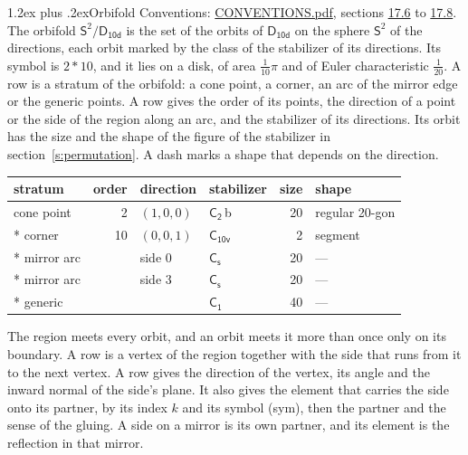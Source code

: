 \documentclass[10pt,a4paper]{article}
\makeatletter
\renewcommand\section{\@startsection{section}{1}{\z@}{-3ex plus -1ex minus -.2ex}%
  {1.2ex plus .2ex}{\normalfont\large\sffamily\bfseries\color{parttitle}}}
\numberwithin{equation}{section}
\newcommand{\grp}[1]{\mathsf{#1}}
\newcommand{\orbname}[1]{#1}
\newcommand{\clsletter}[1]{\,{\scriptsize\color{black!55}#1}}
\newcommand{\dirvec}[3]{(#1, #2, #3)}
\newcommand{\twosphere}{\mathsf{S}^{2}}
\makeatother
\begin{document}
\section{Orbifold}\label{s:orbifold}
Conventions: \href{../../CONVENTIONS.pdf}{CONVENTIONS.pdf}, sections \href{../../CONVENTIONS.pdf\#conv.17.6}{17.6} to \href{../../CONVENTIONS.pdf\#conv.17.8}{17.8}.
The orbifold $\twosphere/\grp{D_{10d}}$ is the set of the orbits of $\grp{D_{10d}}$ on the sphere $\twosphere$ of the directions, each orbit marked by the class of the stabilizer of its directions. Its symbol is $\orbname{2{\ast}10}$, and it lies on a disk, of area $\tfrac{1}{10}\pi$ and of Euler characteristic $\tfrac{1}{20}$.
\leavevmode\label{n:head.stratum}\label{n:head.order.point}\label{n:head.direction}\label{n:head.stabilizer}\label{n:head.size.orbit}\label{n:head.shape}A row is a stratum of the orbifold: a cone point, a corner, an arc of the mirror edge or the generic points. A row gives the order of its points, the direction of a point or the side of the region along an arc, and the stabilizer of its directions. Its orbit has the size and the shape of the figure of the stabilizer in section~\ref{s:permutation}. A dash marks a shape that depends on the direction.
{\small\setlength{\tabcolsep}{4pt}\begin{longtable}{@{}lrllrl@{}}\toprule
stratum & order & direction & stabilizer & size & shape\\\midrule\endhead
\bottomrule\endfoot\endlastfoot
cone point & 2 & $\dirvec{1}{0}{0}$ & \href{C2.pdf}{$\grp{C_{2}}$}\clsletter{b} & 20 & regular 20-gon\\*
corner & 10 & $\dirvec{0}{0}{1}$ & \href{C10v.pdf}{$\grp{C_{10v}}$} & 2 & segment\\*
mirror arc &  & side 0 & \href{C1v.pdf}{$\grp{C_{s}}$} & 20 & ---\\*
mirror arc &  & side 3 & \href{C1v.pdf}{$\grp{C_{s}}$} & 20 & ---\\*
generic &  &  & \href{C1.pdf}{$\grp{C_{1}}$} & 40 & ---\\
\bottomrule\end{longtable}}
\leavevmode\label{n:head.vertex.region}\label{n:head.angle}\label{n:head.normal.side}\label{n:head.partner}\label{n:head.sense}The region meets every orbit, and an orbit meets it more than once only on its boundary. A row is a vertex of the region together with the side that runs from it to the next vertex. A row gives the direction of the vertex, its angle and the inward normal of the side's plane. It also gives the element that carries the side onto its partner, by its index $k$ and its symbol (sym), then the partner and the sense of the gluing. A side on a mirror is its own partner, and its element is the reflection in that mirror.
\end{document}
